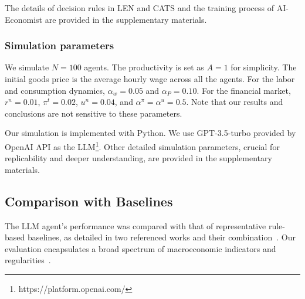 The details of decision rules in LEN and CATS and the training process of AI-Economist are provided in the supplementary materials.

\subsubsection{Simulation parameters} 
We simulate $N=100$ agents. The productivity is set as $A = 1$ for simplicity. The initial goods price is the average hourly wage across all the agents. For the labor and consumption dynamics, $\alpha_w = 0.05$ and $\alpha_P = 0.10$. For the financial market, $r^n = 0.01$, $\pi^t = 0.02$, $u^n = 0.04$, and $\alpha^{\pi} = \alpha^u = 0.5$. Note that our results and conclusions are not sensitive to these parameters.

Our simulation is implemented with Python. We use GPT-3.5-turbo provided by OpenAI API as the LLM\footnote{https://platform.openai.com/}. Other detailed simulation parameters, crucial for replicability and deeper understanding, are provided in the supplementary materials.

\subsection{Comparison with Baselines}
The LLM agent's performance was compared with that of representative rule-based baselines, as detailed in two referenced works and their combination~\cite{lengnick2013agent,gatti2011macroeconomics}. Our evaluation encapsulates a broad spectrum of macroeconomic indicators and regularities~\cite{lengnick2013agent,gatti2011macroeconomics,dawid2018agent,axtell2022agent}.

